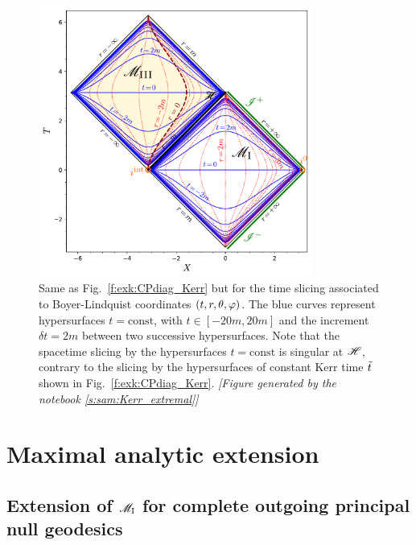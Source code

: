 \begin{figure}
\centerline{\includegraphics[width=0.8\textwidth]{exk_CPdiag_BL.pdf}}
\caption[]{\label{f:exk:CPdiag_BL} \footnotesize
Same as Fig.~\ref{f:exk:CPdiag_Kerr} but for the
time slicing associated to Boyer-Lindquist coordinates $(t,r,\theta,\varphi)$.
The blue curves represent hypersurfaces $t=\mathrm{const}$, with
$t\in[-20 m, 20 m]$ and
the increment $\delta t = 2 m$ between two successive hypersurfaces.
Note that the spacetime slicing by the hypersurfaces $t=\mathrm{const}$
is singular at $\mathscr{H}$, contrary to the slicing by the hypersurfaces
of constant Kerr time ${\tilde t}$ shown in Fig.~\ref{f:exk:CPdiag_Kerr}.
\textsl{[Figure generated by the notebook \ref{s:sam:Kerr_extremal}]}
}
\end{figure}


\section{Maximal analytic extension} \label{s:exk:max_extension}

\subsection{Extension of $\mathscr{M}_{\rm I}$ for complete outgoing principal null geodesics}

